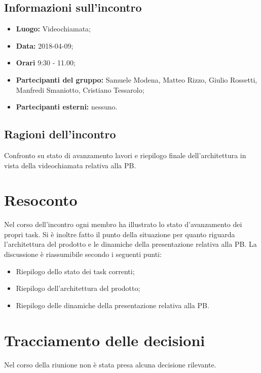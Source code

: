 \documentclass[openany,12pt,a4paper]{article}
\begin{document}
  \subsection{Informazioni sull'incontro} 
   
  \begin{itemize}  
      \item \textbf{Luogo:} Videochiamata;
      \item \textbf{Data:} 2018-04-09; 
      \item \textbf{Orari} 9:30 - 11.00;
      \item \textbf{Partecipanti del gruppo:} Samuele Modena, Matteo Rizzo, Giulio Rossetti, Manfredi Smaniotto, Cristiano Tessarolo; 
      \item \textbf{Partecipanti esterni:} nessuno. 
  \end{itemize} 
 
  \subsection{Ragioni dell'incontro} 
  Confronto su stato di avanzamento lavori e riepilogo finale dell'architettura in vista della videochiamata relativa alla PB.
 
  \section{Resoconto} 
  Nel corso dell'incontro ogni membro ha illustrato lo stato d'avanzamento dei propri task. Si è inoltre fatto il punto della situazione per quanto riguarda l'architettura del prodotto e le dinamiche della presentazione relativa alla PB. La discussione è riassumibile secondo i seguenti punti:   
	
  \begin{itemize}
	\item Riepilogo dello stato dei task correnti;
	\item Riepilogo dell'architettura del prodotto;
	\item Riepilogo delle dinamiche della presentazione relativa alla PB.
  \end{itemize}

  \section{Tracciamento delle decisioni} 
   
  Nel corso della riunione non è stata presa alcuna decisione rilevante.
  
  
\end{document}
